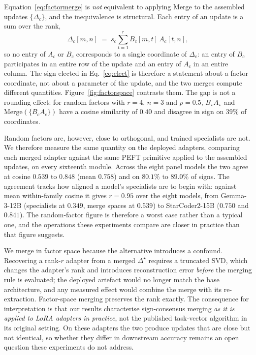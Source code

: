 Equation~\ref{eq:factormerge} is \emph{not} equivalent to applying $\mathrm{Merge}$ to the assembled
updates $\{\Delta_c\}$, and the inequivalence is structural. Each entry of an update is a sum over
the rank,
%
\begin{equation}
\Delta_c[m,n] \;=\; s_c \sum_{t=1}^{r} B_c[m,t]\, A_c[t,n],
\label{eq:ranksum}
\end{equation}
%
so no entry of $A_c$ or $B_c$ corresponds to a single coordinate of $\Delta_c$: an entry of $B_c$
participates in an entire row of the update and an entry of $A_c$ in an entire column. The sign
elected in Eq.~\ref{eq:elect} is therefore a statement about a factor coordinate, not about a
parameter of the update, and the two merges compute different quantities.
Figure~\ref{fig:factorspace} contrasts them. The gap is not a rounding effect: for random factors
with $r = 4$, $n = 3$ and $\rho = 0.5$, $B_{\star}A_{\star}$ and $\mathrm{Merge}(\{B_cA_c\})$ have a
cosine similarity of $0.40$ and disagree in sign on $39\%$ of coordinates.

Random factors are, however, close to orthogonal, and trained specialists are not. We therefore
measure the same quantity on the deployed adapters, comparing each merged adapter against the same
\textsc{PEFT} primitive applied to the assembled updates, on every sixteenth module. Across the
eight panel models the two agree at cosine $0.539$ to $0.848$ (mean $0.758$) and on $80.1\%$ to
$89.0\%$ of signs. The agreement tracks how aligned a model's specialists are to begin with: against
mean within-family cosine it gives $r = 0.95$ over the eight models, from Gemma-3-12B (specialists at
$0.349$, merge spaces at $0.539$) to StarCoder2-15B ($0.750$ and $0.841$). The random-factor figure
is therefore a worst case rather than a typical one, and the operations these experiments compare are
closer in practice than that figure suggests.

We merge in factor space because the alternative introduces a confound. Recovering a rank-$r$ adapter
from a merged $\Delta^{\star}$ requires a truncated SVD, which changes the adapter's rank and
introduces reconstruction error \emph{before} the merging rule is evaluated; the deployed artefact
would no longer match the base architecture, and any measured effect would combine the merge with its
re-extraction. Factor-space merging preserves the rank exactly. The consequence for interpretation is
that our results characterise sign-consensus merging \emph{as it is applied to LoRA adapters in
practice}, not the published task-vector algorithm in its original setting. On these adapters the two
produce updates that are close but not identical, so whether they differ in downstream accuracy
remains an open question these experiments do not address.

